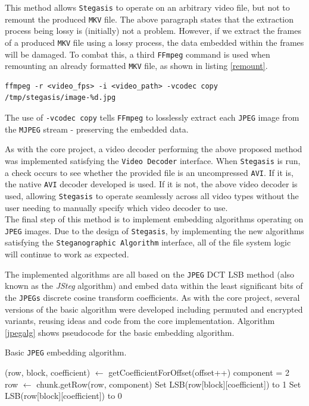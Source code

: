 \documentclass[paper=a4, fontsize=11pt,twoside]{scrartcl}
\numberwithin{table}{section}
\numberwithin{figure}{section}
\numberwithin{algorithm}{section}
\begin{document}
This method allows \texttt{Stegasis} to operate on an arbitrary video file, but not to remount the produced \texttt{MKV} file. The above paragraph states that the extraction process being lossy is (initially) not a problem. However, if we extract the frames of a produced \texttt{MKV} file using a lossy process, the data embedded within the frames will be damaged. To combat this, a third \texttt{FFmpeg} command is used when remounting an already formatted \texttt{MKV} file, as shown in listing \ref{remount}.

\begin{lstlisting}[caption={\texttt{FFmpeg} \texttt{MKV} \texttt{MJPEG} fram extraction command.}, frame=single, label=remount,upquote=true]
ffmpeg -r <video_fps> -i <video_path> -vcodec copy /tmp/stegasis/image-%d.jpg
\end{lstlisting}

The use of \texttt{-vcodec copy} tells \texttt{FFmpeg} to losslessly extract each \texttt{JPEG} image from the \texttt{MJPEG} stream - preserving the embedded data.

As with the core project, a video decoder performing the above proposed method was implemented satisfying the \texttt{Video Decoder} interface. When \texttt{Stegasis} is run, a check occurs to see whether the provided file is an uncompressed \texttt{AVI}. If it is, the native \texttt{AVI} decoder developed is used. If it is not, the above video decoder is used, allowing \texttt{Stegasis} to operate seamlessly across all video types without the user needing to manually specify which video decoder to use.\\

\noindent
The final step of this method is to implement embedding algorithms operating on \texttt{JPEG} images. Due to the design of \texttt{Stegasis}, by implementing the new algorithms satisfying the \texttt{Steganographic Algorithm} interface, all of the file system logic will continue to work as expected.

The implemented algorithms are all based on the \texttt{JPEG} DCT LSB method (also known as the \textit{JSteg} algorithm) and embed data within the least significant bits of the \texttt{JPEGs} discrete cosine transform coefficients. As with the core project, several versions of the basic algorithm were developed including permuted and encrypted variants, reusing ideas and code from the core implementation. Algorithm \ref{jpegalg} shows pseudocode for the basic embedding algorithm.

\begin{algorithm}
\caption{Basic \texttt{JPEG} embedding algorithm.}
\label{jpegalg}
\begin{algorithmic}[1]
		\State (row, block, coefficient) $\gets$ getCoefficientForOffset(offset++)
		\State component = 2
		\State row $\gets$ chunk.getRow(row, component)
			\State Set LSB(row[block][coefficient]) to 1
		\Else
			\State Set LSB(row[block][coefficient]) to 0
		\EndIf
	\EndFor
\EndFor
\end{algorithmic}
\end{algorithm}
\end{document}
